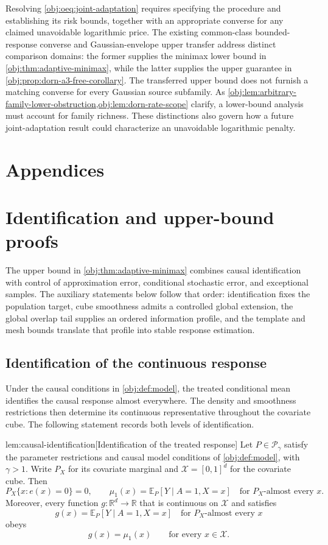 \documentclass[11pt]{article}
\begin{document}
Resolving \cref{obj:oeq:joint-adaptation} requires specifying the procedure and establishing its risk bounds, together with an appropriate converse for any claimed unavoidable logarithmic price. The existing common-class bounded-response converse and Gaussian-envelope upper transfer address distinct comparison domains: the former supplies the minimax lower bound in \cref{obj:thm:adaptive-minimax}, while the latter supplies the upper guarantee in \cref{obj:prop:dorn-a3-free-corollary}. The transferred upper bound does not furnish a matching converse for every Gaussian source subfamily. As \cref{obj:lem:arbitrary-family-lower-obstruction,obj:lem:dorn-rate-scope} clarify, a lower-bound analysis must account for family richness. These distinctions also govern how a future joint-adaptation result could characterize an unavoidable logarithmic penalty.


\appendix

\section*{Appendices}

\section{Identification and upper-bound proofs}

The upper bound in \cref{obj:thm:adaptive-minimax} combines causal identification with control of approximation error, conditional stochastic error, and exceptional samples. The auxiliary statements below follow that order: identification fixes the population target, cube smoothness admits a controlled global extension, the global overlap tail supplies an ordered information profile, and the template and mesh bounds translate that profile into stable response estimation.

\subsection{Identification of the continuous response}

Under the causal conditions in \cref{obj:def:model}, the treated conditional mean identifies the causal response almost everywhere. The density and smoothness restrictions then determine its continuous representative throughout the covariate cube. The following statement records both levels of identification.

\begin{lemmav}{lem:causal-identification}[Identification of the treated response]
Let \(P\in\mathcal P_\gamma\) satisfy the parameter restrictions and causal model conditions of \cref{obj:def:model}, with \(\gamma>1\). Write \(P_X\) for its covariate marginal and \(\mathcal X=[0,1]^d\) for the covariate cube. Then
\[
P_X\{x:e(x)=0\}=0,
\qquad
\mu_1(x)=\mathbb E_P[Y\mid A=1,X=x]
\quad\text{for }P_X\text{-almost every }x.
\]
Moreover, every function \(g:\mathbb R^d\to\mathbb R\) that is continuous on \(\mathcal X\) and satisfies
\[
g(x)=\mathbb E_P[Y\mid A=1,X=x]
\quad\text{for }P_X\text{-almost every }x
\]
obeys
\[
g(x)=\mu_1(x)
\qquad\text{for every }x\in\mathcal X.
\]
\end{lemmav}
\end{document}
